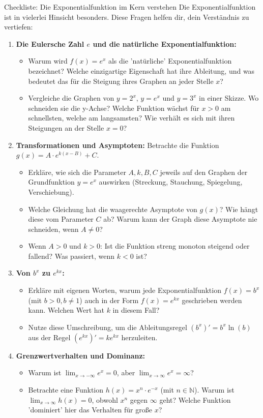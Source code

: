 \begin{aufgabenumgebung}{Checkliste: Die Exponentialfunktion im Kern verstehen}
Die Exponentialfunktion ist in vielerlei Hinsicht besonders. Diese Fragen helfen dir, dein Verständnis zu vertiefen:

\begin{enumerate}[label=(\alph*)]
    \item \textbf{Die Eulersche Zahl $e$ und die natürliche Exponentialfunktion:}
    \begin{itemize}
        \item Warum wird $f(x)=e^x$ als die 'natürliche' Exponentialfunktion bezeichnet? Welche einzigartige Eigenschaft hat ihre Ableitung, und was bedeutet das für die Steigung ihres Graphen an jeder Stelle $x$?
        \item Vergleiche die Graphen von $y=2^x$, $y=e^x$ und $y=3^x$ in einer Skizze. Wo schneiden sie die y-Achse? Welche Funktion wächst für $x>0$ am schnellsten, welche am langsamsten? Wie verhält es sich mit ihren Steigungen an der Stelle $x=0$?
    \end{itemize}
    \item \textbf{Transformationen und Asymptoten:}
    Betrachte die Funktion $g(x) = A \cdot e^{k(x-B)} + C$.
    \begin{itemize}
        \item Erkläre, wie sich die Parameter $A, k, B, C$ jeweils auf den Graphen der Grundfunktion $y=e^x$ auswirken (Streckung, Stauchung, Spiegelung, Verschiebung).
        \item Welche Gleichung hat die waagerechte Asymptote von $g(x)$? Wie hängt diese vom Parameter $C$ ab? Warum kann der Graph diese Asymptote nie schneiden, wenn $A \neq 0$?
        \item Wenn $A>0$ und $k>0$: Ist die Funktion streng monoton steigend oder fallend? Was passiert, wenn $k<0$ ist?
    \end{itemize}
    \item \textbf{Von $b^x$ zu $e^{kx}$:}
    \begin{itemize}
        \item Erkläre mit eigenen Worten, warum jede Exponentialfunktion $f(x)=b^x$ (mit $b>0, b\neq1$) auch in der Form $f(x)=e^{kx}$ geschrieben werden kann. Welchen Wert hat $k$ in diesem Fall?
        \item Nutze diese Umschreibung, um die Ableitungsregel $(b^x)' = b^x \ln(b)$ aus der Regel $(e^{kx})' = k e^{kx}$ herzuleiten.
    \end{itemize}
    \item \textbf{Grenzwertverhalten und Dominanz:}
    \begin{itemize}
        \item Warum ist $\lim_{x \to -\infty} e^x = 0$, aber $\lim_{x \to \infty} e^x = \infty$?
        \item Betrachte eine Funktion $h(x) = x^n \cdot e^{-x}$ (mit $n \in \mathbb{N}$). Warum ist $\lim_{x \to \infty} h(x) = 0$, obwohl $x^n$ gegen $\infty$ geht? Welche Funktion 'dominiert' hier das Verhalten für große $x$?
    \end{itemize}
\end{enumerate}
\end{aufgabenumgebung}


